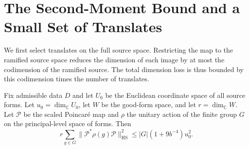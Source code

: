 \section{The Second-Moment Bound and a Small Set of Translates}
\label{sec:b-translate}

We first select translates on the full source space. Restricting the map to the ramified source space reduces the dimension of each image by at most the codimension of the ramified source. The total dimension loss is thus bounded by this codimension times the number of translates.

\begin{lemma}
\label{lem:b-second-moment}
\emitthmsource
Fix admissible data $D$ and let $U_0$ be the Euclidean coordinate space of all source forms.
Let $u_0=\dim_{\mathbb C}U_0$, let $W$ be the good-form space, and let $r=\dim_{\mathbb C}W$.
Let $\mathcal P$ be the scaled Poincaré map and $\rho$ the unitary action of the finite group
$G$ on the principal-level space of forms. Then
\begin{equation}
 r\sum_{g\in G}\|\mathcal P^*\rho(g)\mathcal P\|_{\mathrm{HS}}^2
 \le |G|(1+9b^{-4})u_0^2 .
\label{eq:b-second-moment}
\end{equation}
\end{lemma}
